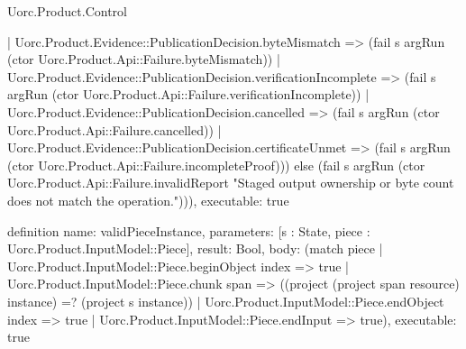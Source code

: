 \begin{lexlean}{Uorc.Product.Control}
\begin{semanticmodule}
{    | Uorc.Product.Evidence::PublicationDecision.byteMismatch => (fail s argRun (ctor Uorc.Product.Api::Failure.byteMismatch))
    | Uorc.Product.Evidence::PublicationDecision.verificationIncomplete => (fail s argRun (ctor Uorc.Product.Api::Failure.verificationIncomplete))
    | Uorc.Product.Evidence::PublicationDecision.cancelled => (fail s argRun (ctor Uorc.Product.Api::Failure.cancelled))
    | Uorc.Product.Evidence::PublicationDecision.certificateUnmet => (fail s argRun (ctor Uorc.Product.Api::Failure.incompleteProof))) else (fail s argRun (ctor Uorc.Product.Api::Failure.invalidReport "Staged output ownership or byte count does not match the operation."))),
  executable: true
}

definition{
  name: validPieceInstance,
  parameters: [s : State, piece : Uorc.Product.InputModel::Piece],
  result: Bool,
  body: (match piece
    | Uorc.Product.InputModel::Piece.beginObject index => true
    | Uorc.Product.InputModel::Piece.chunk span => ((project (project span resource) instance) =? (project s instance))
    | Uorc.Product.InputModel::Piece.endObject index => true
    | Uorc.Product.InputModel::Piece.endInput => true),
  executable: true
}


\end{semanticmodule}
\end{lexlean}
